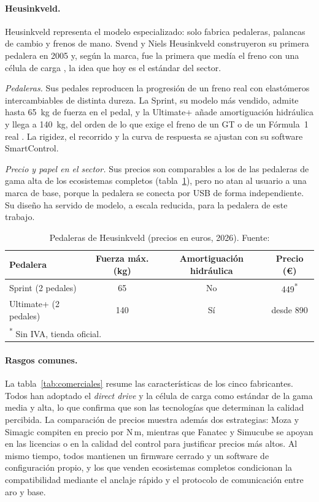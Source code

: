 \paragraph{Heusinkveld.}
Heusinkveld representa el modelo especializado: solo fabrica pedaleras, palancas de cambio y frenos de mano. Svend y Niels Heusinkveld construyeron su primera pedalera en 2005 y, según la marca, fue la primera que medía el freno con una célula de carga \parencite{heusinkveld_web}, la idea que hoy es el estándar del sector.

\textit{Pedaleras.} Sus pedales reproducen la progresión de un freno real con elastómeros intercambiables de distinta dureza. La Sprint, su modelo más vendido, admite hasta 65~kg de fuerza en el pedal, y la Ultimate+ añade amortiguación hidráulica y llega a 140~kg, del orden de lo que exige el freno de un GT o de un Fórmula~1 real \parencite{heusinkveld_web}. La rigidez, el recorrido y la curva de respuesta se ajustan con su software SmartControl.

\textit{Precio y papel en el sector.} Sus precios son comparables a los de las pedaleras de gama alta de los ecosistemas completos (tabla~\ref{tab:heusinkveld}), pero no atan al usuario a una marca de base, porque la pedalera se conecta por USB de forma independiente. Su diseño ha servido de modelo, a escala reducida, para la pedalera de este trabajo.

\begin{table}[htbp]
	\centering
	\caption[Pedaleras de Heusinkveld (precios en euros, 2026)]{Pedaleras de Heusinkveld (precios en euros, 2026). Fuente: \parencite{heusinkveld_web}}
	\label{tab:heusinkveld}
	\small
	\begin{tabular}{|l|c|c|c|}
		\hline
		\textbf{Pedalera} & \textbf{Fuerza máx. (kg)} & \textbf{Amortiguación hidráulica} & \textbf{Precio (\euro)} \\
		\hline
		Sprint (2 pedales)     & 65  & No & 449\textsuperscript{*} \\
		Ultimate+ (2 pedales)  & 140 & Sí & desde 890 \\
		\hline
		\multicolumn{4}{l}{\footnotesize \textsuperscript{*} Sin IVA, tienda oficial.} \\
	\end{tabular}
\end{table}

\paragraph{Rasgos comunes.}
La tabla~\ref{tab:comerciales} resume las características de los cinco fabricantes. Todos han adoptado el \textit{direct drive} y la célula de carga como estándar de la gama media y alta, lo que confirma que son las tecnologías que determinan la calidad percibida. La comparación de precios muestra además dos estrategias: Moza y Simagic compiten en precio por N\,m, mientras que Fanatec y Simucube se apoyan en las licencias o en la calidad del control para justificar precios más altos. Al mismo tiempo, todos mantienen un firmware cerrado y un software de configuración propio, y los que venden ecosistemas completos condicionan la compatibilidad mediante el anclaje rápido y el protocolo de comunicación entre aro y base.

